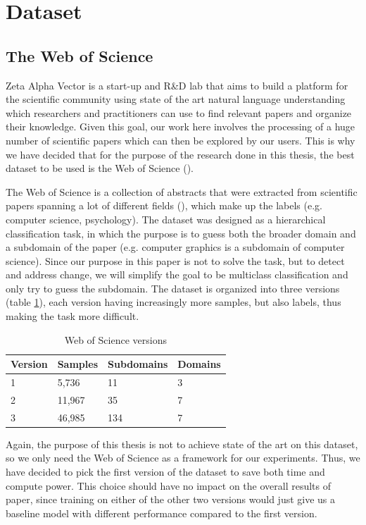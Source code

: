 \documentclass[12pt]{extreport}
\begin{document}
\section{Dataset}

\subsection{The Web of Science} \label{wos}

Zeta Alpha Vector is a start-up and R\&D lab that aims to build a platform for the scientific community using state of the art natural language understanding which researchers and practitioners can use to find relevant papers and organize their knowledge. Given this goal, our work here involves the processing of a huge number of scientific papers which can then be explored by our users. This is why we have decided that for the purpose of the research done in this thesis, the best dataset to be used is the Web of Science (\cite{wos}).

The Web of Science is a collection of abstracts that were extracted from scientific papers spanning a lot of different fields (\cite{wos}), which make up the labels (e.g. computer science, psychology). The dataset was designed as a hierarchical classification task, in which the purpose is to guess both the broader domain and a subdomain of the paper (e.g. computer graphics is a subdomain of computer science). Since our purpose in this paper is not to solve the task, but to detect and address change, we will simplify the goal to be multiclass classification and only try to guess the subdomain. The dataset is organized into three versions (table \ref{table:wos}), each version having increasingly more samples, but also labels, thus making the task more difficult.

\begin{table}[ht!]
\centering
\begin{tabular}{|l|l|l|l|}
\hline
Version & Samples & Subdomains & Domains \\ \hline
1       & 5,736   & 11         & 3       \\ \hline
2       & 11,967  & 35         & 7       \\ \hline
3       & 46,985  & 134        & 7       \\ \hline
\end{tabular}
\caption{Web of Science versions}
\label{table:wos}
\end{table}

Again, the purpose of this thesis is not to achieve state of the art on this dataset, so we only need the Web of Science as a framework for our experiments. Thus, we have decided to pick the first version of the dataset to save both time and compute power. This choice should have no impact on the overall results of paper, since training on either of the other two versions would just give us a baseline model with different performance compared to the first version.
\end{document}
